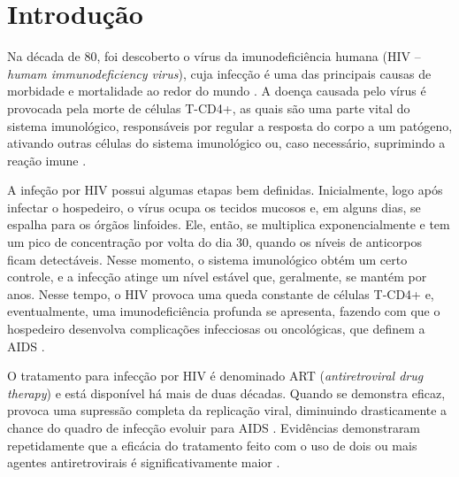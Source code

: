 \section{Introdução}





Na década de 80, foi descoberto o vírus da imunodeficiência humana (HIV -- \textit{humam immunodeficiency virus}), cuja infecção é uma das principais causas de morbidade e mortalidade ao redor do mundo \cite{nature}.
A doença causada pelo vírus é provocada pela morte de células T-CD4+, as quais são uma parte vital do sistema imunológico, responsáveis por regular a resposta do corpo a um patógeno, ativando outras células do sistema imunológico ou, caso necessário, suprimindo a reação imune \cite{tcd4+}.

A infeção por HIV possui algumas etapas bem definidas.
Inicialmente, logo após infectar o hospedeiro, o vírus ocupa os tecidos mucosos e, em alguns dias, se espalha para os órgãos linfoides.
Ele, então, se multiplica exponencialmente e tem um pico de concentração por volta do dia 30, quando os níveis de anticorpos ficam detectáveis.
Nesse momento, o sistema imunológico obtém um certo controle, e a infecção atinge um nível estável que, geralmente, se mantém por anos.
Nesse tempo, o HIV provoca uma queda constante de células T-CD4+ e, eventualmente, uma imunodeficiência profunda se apresenta, fazendo com que o hospedeiro desenvolva complicações infecciosas ou oncológicas, que definem a AIDS \cite{nature}.

O tratamento para infecção por HIV é denominado ART (\textit{antiretroviral drug therapy}) e está disponível há mais de duas décadas.
Quando se demonstra eficaz, provoca uma supressão completa da replicação viral, diminuindo drasticamente a chance do quadro de infecção evoluir para AIDS \cite{nature}.
Evidências demonstraram repetidamente que a eficácia do tratamento feito com o uso de dois ou mais agentes antiretrovirais é significativamente maior \cite{comb-drug}.

